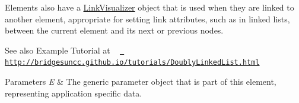 Elements also have a \mbox{\hyperlink{classbridges_1_1base_1_1_link_visualizer}{Link\+Visualizer}} object that is used when they are linked to another element, appropriate for setting link attributes, such as in linked lists, between the current element and its next or previous nodes.

\begin{DoxySeeAlso}{See also}
Example Tutorial at ~\newline
 \href{http://bridgesuncc.github.io/tutorials/DoublyLinkedList.html}{\texttt{ http\+://bridgesuncc.\+github.\+io/tutorials/\+Doubly\+Linked\+List.\+html}}
\end{DoxySeeAlso}

\begin{DoxyParams}{Parameters}
{\em E} & The generic parameter object that is part of this element, representing application specific data. \\
\hline
\end{DoxyParams}
